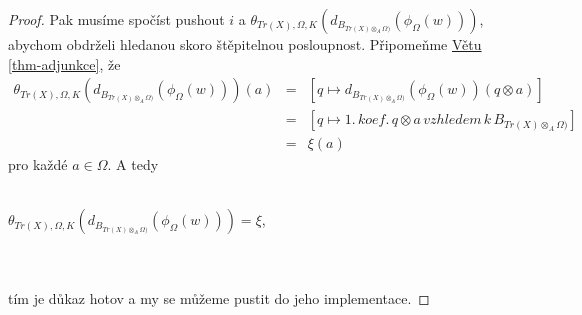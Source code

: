 \begin{proof}
        Pak musíme spočíst pushout $i$ a 
        $\theta_{Tr(X),\Omega,K}(d_{B_{Tr(X)\otimes_A \Omega)}}( \phi_\Omega(w) 
        ))$, abychom obdrželi hledanou skoro štěpitelnou posloupnost. Připomeňme 
        \hyperref[thm-adjunkce]{Větu \ref*{thm-adjunkce}}, že
        \begin{eqnarray}
          \theta_{Tr(X),\Omega,K}(d_{B_{Tr(X)\otimes_A \Omega)}}( \phi_\Omega(w) ))(a)
            &=& [q\mapsto d_{B_{Tr(X)\otimes_A \Omega)}}( \phi_\Omega(w) )(q\otimes a)]\nonumber \\
            &=& [q\mapsto 1.\, koef.\, q\otimes a\,vzhledem\,k\,B_{Tr(X)\otimes_A \Omega)}]\nonumber \\
            &=& \xi(a) \nonumber 
        \end{eqnarray}
        pro každé $a\in\Omega$. A tedy 
        \\\\\centerline{$\theta_{Tr(X),\Omega,K}(d_{B_{Tr(X)\otimes_A \Omega)}}( \phi_\Omega(w) ))=\xi$,}\\\\
        tím je důkaz hotov a my se můžeme pustit do jeho implementace.
      \end{proof}











